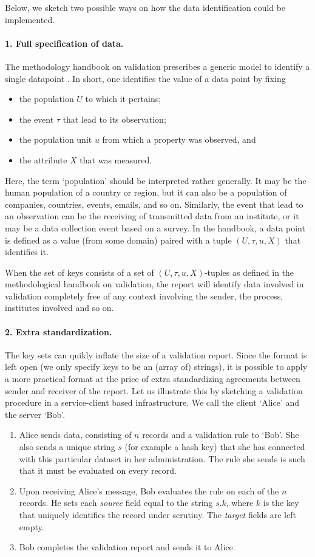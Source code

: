 Below, we sketch two possible ways on how the data identification could be
implemented.

\paragraph{1. Full specification of data.} The methodology handbook on validation
prescribes a generic model to identify a single datapoint
\citep[Chapter~5]{zio2015methodology}. In short, one identifies the value of a
data point by fixing
\begin{itemize}
\item the population $U$ to which it pertains;
\item the event $\tau$ that lead to its observation;
\item the population unit $u$ from which a property was observed, and
\item the attribute $X$ that was measured.
\end{itemize}
Here, the term `population' should be interpreted rather generally. It may be
the human population of a country or region, but it can also be a population of
companies, countries, events, emails, and so on. Similarly, the event that lead
to an observation can be the receiving of transmitted data from an institute,
or it may be a data collection event based on a survey.  In the handbook, a
data point is defined as a value (from some domain) paired with a tuple
$(U,\tau,u,X)$ that identifies it.


When the set of keys consists of a set of $(U,\tau,u,X)$-tuples as defined in
the methodological handbook on validation, the report will identify data
involved in validation completely free of any context involving the sender, the
process, institutes involved and so on. 

\paragraph{2. Extra standardization.} The key sets can quikly inflate the size
of a validation report. Since the format is left open (we only specify keys to
be an (array of) strings), it is possible to apply a more practical format at
the price of extra standardizing agreements between sender and receiver of the
report. Let us illustrate this by sketching a validation procedure in a service-client
based infrastructure. We call the client `Alice' and the server `Bob'.
\begin{enumerate}[noitemsep]
\item Alice sends data, consisting of $n$ records and a validation rule to `Bob'.
She also sends a unique string $s$ (for example a hash key) that she has connected
with this particular dataset in her administration. The rule she sends is such that
it must be evaluated on every record.
\item Upon receiving Alice's message, Bob evaluates the rule on each of the $n$
records. He sets each \emph{source} field equal to the string $s.k$, where $k$
is the key that uniquely identifies the record under scrutiny. The \emph{target}
fields are left empty.
\item Bob completes the validation report and sends it to Alice.
\end{enumerate}

